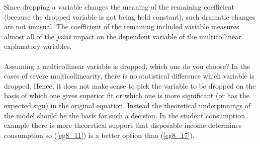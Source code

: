 \documentclass[11pt]{article}
\begin{document}
Since dropping a variable changes the meaning of the remaining coefficient (because the dropped variable is not being held constant), such dramatic changes are not unusual. The coefficient of the remaining included variable measures almost all of the \textit{joint} impact on the dependent variable of the multicollinear explanatory variables.\\ \\
Assuming a multicollinear variable is dropped, which one do you choose? In the cases of severe multicollinearity, there is no statistical difference which variable is dropped. Hence, it does not make sense to pick the variable to be dropped on the basis of which one gives superior fit or which one is more significant (or has the expected sign) in the original equation. Instead the theoretical underpinnings of the model should be the basis for such a decision. In the student consumption example there is more theoretical support that disposable income determines consumption so (\ref{eg8_11}) is a better option than (\ref{eg8_17}).
\end{document}
